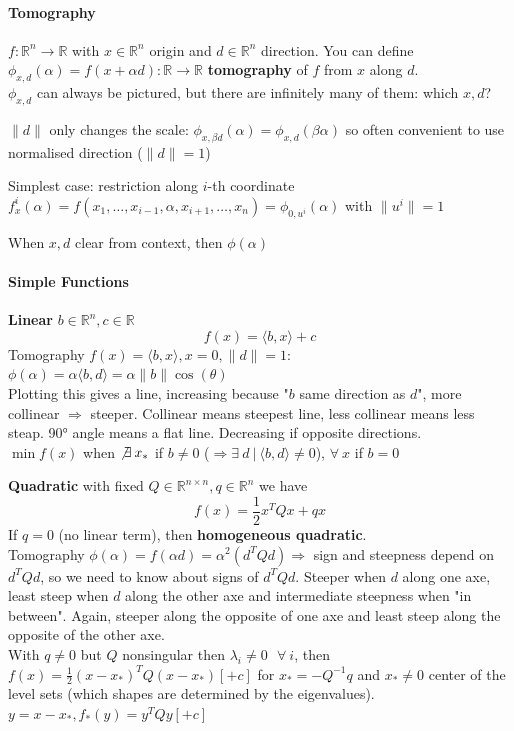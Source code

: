 \documentclass[10pt]{report}
\begin{document}
\paragraph{Tomography} $f:\mathbb{R}^n \rightarrow \mathbb{R}$ with $x\in \mathbb{R}^n$ origin and $d\in \mathbb{R}^n$ direction. You can define $\phi_{x,d}(\alpha) = f(x + \alpha d): \mathbb{R} \rightarrow \mathbb{R}$ \textbf{tomography} of $f$ from $x$ along $d$.\\
$\phi_{x,d}$ can always be pictured, but there are infinitely many of them: which $x,d$?\begin{list}{}{}
	\item $\|d\|$ only changes the scale: $\phi_{x,\beta d}(\alpha) = \phi_{x,d}(\beta \alpha)$ so often convenient to use normalised direction ($\|d\| = 1$)
	\item Simplest case: restriction along $i$-th coordinate\\
	$f_x^i(\alpha) = f(x_1,\ldots,x_{i-1},\alpha,x_{i+1},\ldots,x_n) = \phi_{0,u^i}(\alpha)$ with $\|u^i\| = 1$
	\item When $x,d$ clear from context, then $\phi(\alpha)$
\end{list}
\paragraph{Simple Functions} \begin{list}{}{}
	\item \textbf{Linear} $b \in \mathbb{R}^n, c\in \mathbb{R}$ $$f(x) = \langle b,x\rangle + c$$
	Tomography $f(x) = \langle b,x\rangle, x = 0, \|d\|=1$: $\phi(\alpha) = \alpha\langle b, d\rangle = \alpha\|b\|\cos(\theta)$\\
	Plotting this gives a line, increasing because "$b$ same direction as $d$", more collinear $\Rightarrow$ steeper. Collinear means steepest line, less collinear means less steap. 90° angle means a flat line. Decreasing if opposite directions.\\
	$\min f(x)$ when $\not\exists\:x_*$ if $b \neq 0$ ($\Rightarrow \exists\: d\:|\:\langle b,d\rangle \neq 0$), $\forall\:x$ if $b = 0$
	\item \textbf{Quadratic} with fixed $Q\in \mathbb{R}^{n\times n}, q\in \mathbb{R}^n$ we have $$f(x) = \frac{1}{2}x^TQx + qx$$
	If $q=0$ (no linear term), then \textbf{homogeneous quadratic}.\\
	Tomography $\phi(\alpha) = f(\alpha d) = \alpha^2(d^TQd)\Rightarrow$ sign and steepness depend on $d^TQd$, so we need to know about signs of $d^TQd$. Steeper when $d$ along one axe, least steep when $d$ along the other axe and intermediate steepness when "in between". Again, steeper along the opposite of one axe and least steep along the opposite of the other axe.\\
	With $q\neq 0$ but $Q$ nonsingular then $\lambda_i\neq 0\:\:\:\forall\:i$, then $f(x)=\frac{1}{2}(x-x_*)^TQ(x-x_*) [+c]$ for $x_* = -Q^{-1}q$ and $x_* \neq 0$ center of the level sets (which shapes are determined by the eigenvalues).\\
	$y = x - x_*, f_*(y) = y^TQy [+c]$
\end{list}
\end{document}
